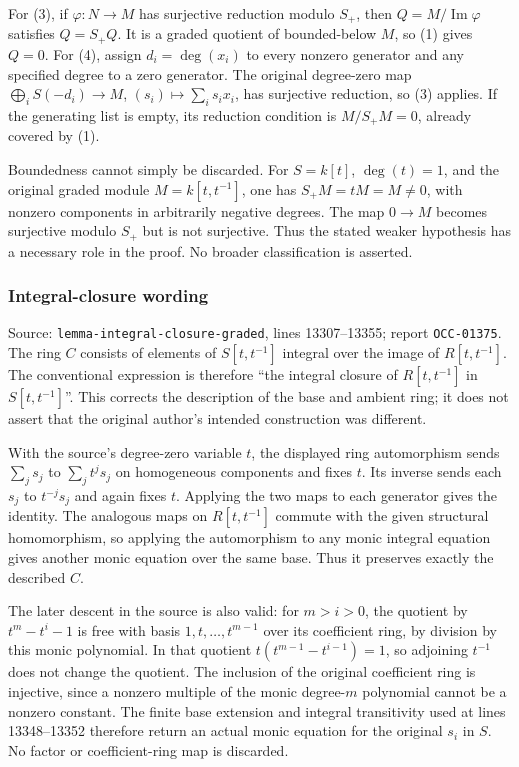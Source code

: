 For (3), if \(\varphi:N\to M\) has surjective reduction modulo \(S_+\), then \(Q=M/\operatorname{Im}\varphi\) satisfies \(Q=S_+Q\). It is a graded quotient of bounded-below \(M\), so (1) gives \(Q=0\). For (4), assign \(d_i=\deg(x_i)\) to every nonzero generator and any specified degree to a zero generator. The original degree-zero map \(\bigoplus_i S(-d_i)\to M\), \((s_i)\mapsto\sum_i s_i x_i\), has surjective reduction, so (3) applies. If the generating list is empty, its reduction condition is \(M/S_+M=0\), already covered by (1).

Boundedness cannot simply be discarded. For \(S=k[t]\), \(\deg(t)=1\), and the original graded module \(M=k[t,t^{-1}]\), one has \(S_+M=tM=M\ne0\), with nonzero components in arbitrarily negative degrees. The map \(0\to M\) becomes surjective modulo \(S_+\) but is not surjective. Thus the stated weaker hypothesis has a necessary role in the proof. No broader classification is asserted.

\subsubsection{Integral-closure wording}\label{integral-closure-wording}

Source: \texttt{lemma-integral-closure-graded}, lines 13307--13355; report \texttt{OCC-01375}. The ring \(C\) consists of elements of \(S[t,t^{-1}]\) integral over the image of \(R[t,t^{-1}]\). The conventional expression is therefore ``the integral closure of \(R[t,t^{-1}]\) in \(S[t,t^{-1}]\)''. This corrects the description of the base and ambient ring; it does not assert that the original author's intended construction was different.

With the source's degree-zero variable \(t\), the displayed ring automorphism sends \(\sum_j s_j\) to \(\sum_j t^j s_j\) on homogeneous components and fixes \(t\). Its inverse sends each \(s_j\) to \(t^{-j}s_j\) and again fixes \(t\). Applying the two maps to each generator gives the identity. The analogous maps on \(R[t,t^{-1}]\) commute with the given structural homomorphism, so applying the automorphism to any monic integral equation gives another monic equation over the same base. Thus it preserves exactly the described \(C\).

The later descent in the source is also valid: for \(m>i>0\), the quotient by \(t^m-t^i-1\) is free with basis \(1,t,\ldots,t^{m-1}\) over its coefficient ring, by division by this monic polynomial. In that quotient \(t(t^{m-1}-t^{i-1})=1\), so adjoining \(t^{-1}\) does not change the quotient. The inclusion of the original coefficient ring is injective, since a nonzero multiple of the monic degree-\(m\) polynomial cannot be a nonzero constant. The finite base extension and integral transitivity used at lines 13348--13352 therefore return an actual monic equation for the original \(s_i\) in \(S\). No factor or coefficient-ring map is discarded.

